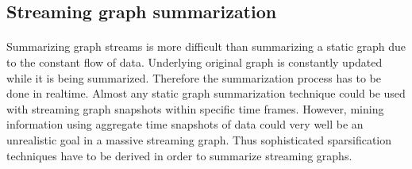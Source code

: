 \subsection{Streaming graph summarization}

\paragraph{}
Summarizing graph streams is more difficult than summarizing a static graph due to the constant flow of data. Underlying original graph is constantly updated while it is being summarized. Therefore the summarization process has to be done in realtime. Almost any static graph summarization technique could be used with streaming graph snapshots within specific time frames. However, mining information using aggregate time snapshots of data could very well be an unrealistic goal in a massive streaming graph. Thus sophisticated sparsification techniques have to be derived in order to summarize streaming graphs.









